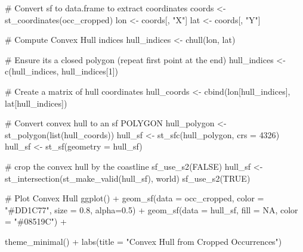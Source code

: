 \documentclass[
  letterpaper,
  DIV=11,
  numbers=noendperiod]{scrartcl}
\newenvironment{Shaded}{\begin{snugshade}}{\end{snugshade}}
\newcommand{\AttributeTok}[1]{\textcolor[rgb]{0.40,0.45,0.13}{#1}}
\newcommand{\CommentTok}[1]{\textcolor[rgb]{0.37,0.37,0.37}{#1}}
\newcommand{\ConstantTok}[1]{\textcolor[rgb]{0.56,0.35,0.01}{#1}}
\newcommand{\DecValTok}[1]{\textcolor[rgb]{0.68,0.00,0.00}{#1}}
\newcommand{\FloatTok}[1]{\textcolor[rgb]{0.68,0.00,0.00}{#1}}
\newcommand{\FunctionTok}[1]{\textcolor[rgb]{0.28,0.35,0.67}{#1}}
\newcommand{\NormalTok}[1]{\textcolor[rgb]{0.00,0.23,0.31}{#1}}
\newcommand{\OtherTok}[1]{\textcolor[rgb]{0.00,0.23,0.31}{#1}}
\newcommand{\SpecialCharTok}[1]{\textcolor[rgb]{0.37,0.37,0.37}{#1}}
\newcommand{\StringTok}[1]{\textcolor[rgb]{0.13,0.47,0.30}{#1}}
\begin{document}
\begin{Shaded}
\begin{Highlighting}[]
\CommentTok{\# Convert sf to data.frame to extract coordinates}
\NormalTok{coords }\OtherTok{\textless{}{-}} \FunctionTok{st\_coordinates}\NormalTok{(occ\_cropped)}
\NormalTok{lon }\OtherTok{\textless{}{-}}\NormalTok{ coords[, }\StringTok{"X"}\NormalTok{]}
\NormalTok{lat }\OtherTok{\textless{}{-}}\NormalTok{ coords[, }\StringTok{"Y"}\NormalTok{]}

\CommentTok{\# Compute Convex Hull indices}
\NormalTok{hull\_indices }\OtherTok{\textless{}{-}} \FunctionTok{chull}\NormalTok{(lon, lat)}

\CommentTok{\# Ensure it\textquotesingle{}s a closed polygon (repeat first point at the end)}
\NormalTok{hull\_indices }\OtherTok{\textless{}{-}} \FunctionTok{c}\NormalTok{(hull\_indices, hull\_indices[}\DecValTok{1}\NormalTok{])}

\CommentTok{\# Create a matrix of hull coordinates}
\NormalTok{hull\_coords }\OtherTok{\textless{}{-}} \FunctionTok{cbind}\NormalTok{(lon[hull\_indices], lat[hull\_indices])}

\CommentTok{\# Convert convex hull to an sf POLYGON}
\NormalTok{hull\_polygon }\OtherTok{\textless{}{-}} \FunctionTok{st\_polygon}\NormalTok{(}\FunctionTok{list}\NormalTok{(hull\_coords))}
\NormalTok{hull\_sf }\OtherTok{\textless{}{-}} \FunctionTok{st\_sfc}\NormalTok{(hull\_polygon, }\AttributeTok{crs =} \DecValTok{4326}\NormalTok{)}
\NormalTok{hull\_sf }\OtherTok{\textless{}{-}} \FunctionTok{st\_sf}\NormalTok{(}\AttributeTok{geometry =}\NormalTok{ hull\_sf)}

\CommentTok{\# crop the convex hull by the coastline}
\FunctionTok{sf\_use\_s2}\NormalTok{(}\ConstantTok{FALSE}\NormalTok{)}
\NormalTok{hull\_sf }\OtherTok{\textless{}{-}} \FunctionTok{st\_intersection}\NormalTok{(}\FunctionTok{st\_make\_valid}\NormalTok{(hull\_sf), world)}
\FunctionTok{sf\_use\_s2}\NormalTok{(}\ConstantTok{TRUE}\NormalTok{)}

\CommentTok{\# Plot Convex Hull}
\FunctionTok{ggplot}\NormalTok{() }\SpecialCharTok{+}
  \FunctionTok{geom\_sf}\NormalTok{(}\AttributeTok{data =}\NormalTok{ occ\_cropped,  }\AttributeTok{color =} \StringTok{"\#DD1C77"}\NormalTok{, }\AttributeTok{size =} \FloatTok{0.8}\NormalTok{, }\AttributeTok{alpha=}\FloatTok{0.5}\NormalTok{) }\SpecialCharTok{+}
  \FunctionTok{geom\_sf}\NormalTok{(}\AttributeTok{data =}\NormalTok{ hull\_sf, }\AttributeTok{fill =} \ConstantTok{NA}\NormalTok{, }\AttributeTok{color =} \StringTok{"\#08519C"}\NormalTok{) }\SpecialCharTok{+}

  \FunctionTok{theme\_minimal}\NormalTok{() }\SpecialCharTok{+}
  \FunctionTok{labs}\NormalTok{(}\AttributeTok{title =} \StringTok{"Convex Hull from Cropped Occurrences"}\NormalTok{)}
\end{Highlighting}
\end{Shaded}
\end{document}
